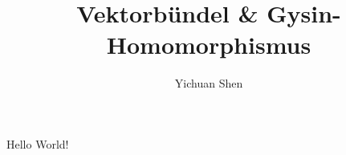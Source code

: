 \documentclass[10pt,a4paper]{article}
\author{Yichuan Shen}
\title{Vektorbündel \& Gysin-Homomorphismus}
\begin{document}
\maketitle

Hello World!
\end{document}

